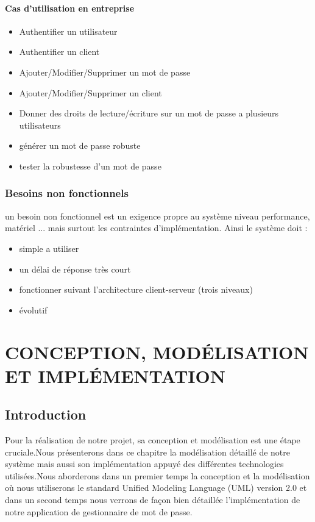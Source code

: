 \documentclass[11pt,a4paper]{report}
\begin{document}
 \subsubsection{Cas d'utilisation en entreprise}
 \begin{itemize}
 \item Authentifier un utilisateur
 \item Authentifier un client
 \item Ajouter/Modifier/Supprimer un mot de passe
 \item Ajouter/Modifier/Supprimer un client
 \item Donner des droits de lecture/écriture sur un mot de passe a plusieurs utilisateurs
 \item générer un mot de passe robuste
 \item tester la robustesse d'un mot de passe
 \end{itemize}
 
 \subsection{Besoins non fonctionnels}
 un besoin non fonctionnel est un exigence propre au système niveau performance, matériel ... mais surtout les contraintes d'implémentation. Ainsi le système doit :
 \begin{itemize}
 \item simple a utiliser
 \item un délai de réponse très court
 \item fonctionner suivant l'architecture client-serveur (trois niveaux) 
 \item évolutif
 \end{itemize}

\chapter{CONCEPTION, MODÉLISATION ET IMPLÉMENTATION}
\section{Introduction}
 Pour la réalisation de notre projet, sa conception et modélisation est une étape cruciale.Nous présenterons dans ce chapitre la modélisation détaillé de notre système mais aussi son implémentation appuyé des différentes technologies utilisées.Nous aborderons dans un premier temps la conception et la modélisation où nous utiliserons le standard Unified Modeling Language (UML) version 2.0 et dans un second temps nous verrons de façon bien
détaillée l'implémentation de notre application de gestionnaire de mot de passe.
 
\end{document}
